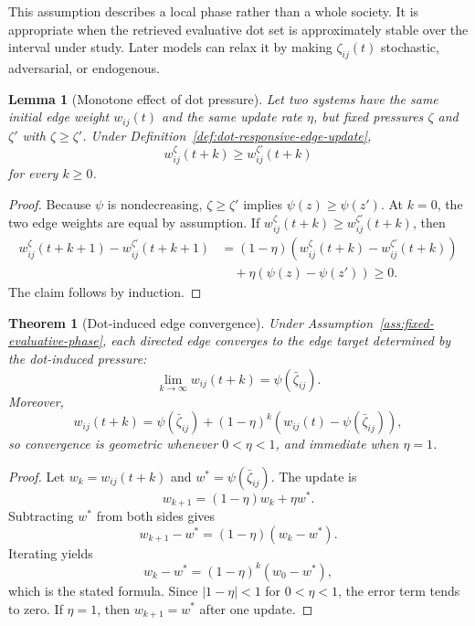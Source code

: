 \documentclass[11pt]{article}
\newtheorem{theorem}{Theorem}
\newtheorem{lemma}{Lemma}
\theoremstyle{remark}
\begin{document}
This assumption describes a local phase rather than a whole society. It
is appropriate when the retrieved evaluative dot set is approximately
stable over the interval under study. Later models can relax it by
making $\zeta_{ij}(t)$ stochastic, adversarial, or endogenous.

\begin{lemma}[Monotone effect of dot pressure]\label{lem:monotone-dot-pressure}
Let two systems have the same initial edge weight $w_{ij}(t)$ and the
same update rate $\eta$, but fixed pressures $\zeta$ and $\zeta'$ with
$\zeta\geq \zeta'$. Under Definition~\ref{def:dot-responsive-edge-update},
$$
w_{ij}^{\zeta}(t+k)\geq w_{ij}^{\zeta'}(t+k)
$$
for every $k\geq0$.
\end{lemma}

\begin{proof}
Because $\psi$ is nondecreasing, $\zeta\geq \zeta'$ implies
$\psi(z)\geq\psi(z')$. At $k=0$, the two edge weights are equal by
assumption. If $w_{ij}^{\zeta}(t+k)\geq w_{ij}^{\zeta'}(t+k)$, then
\begin{align*}
w_{ij}^{\zeta}(t+k+1)-w_{ij}^{\zeta'}(t+k+1)
&=(1-\eta)\left(w_{ij}^{\zeta}(t+k)-w_{ij}^{\zeta'}(t+k)\right)\\
&\quad+\eta\left(\psi(z)-\psi(z')\right)\geq0.
\end{align*}
The claim follows by induction.
\end{proof}

\begin{theorem}[Dot-induced edge convergence]\label{thm:dot-induced-edge-convergence}
Under Assumption~\ref{ass:fixed-evaluative-phase}, each directed edge
converges to the edge target determined by the dot-induced pressure:
$$
\lim_{k\to\infty}w_{ij}(t+k)=\psi(\bar{\zeta}_{ij}).
$$
Moreover,
$$
w_{ij}(t+k)=\psi(\bar{\zeta}_{ij})+(1-\eta)^k\left(w_{ij}(t)-\psi(\bar{\zeta}_{ij})\right),
$$
so convergence is geometric whenever $0<\eta<1$, and immediate when
$\eta=1$.
\end{theorem}

\begin{proof}
Let $w_k=w_{ij}(t+k)$ and $w^*=\psi(\bar{\zeta}_{ij})$. The update is
$$
w_{k+1}=(1-\eta)w_k+\eta w^*.
$$
Subtracting $w^*$ from both sides gives
$$
w_{k+1}-w^*=(1-\eta)(w_k-w^*).
$$
Iterating yields
$$
w_k-w^*=(1-\eta)^k(w_0-w^*),
$$
which is the stated formula. Since $|1-\eta|<1$ for $0<\eta<1$, the
error term tends to zero. If $\eta=1$, then $w_{k+1}=w^*$ after one
update.
\end{proof}
\end{document}
